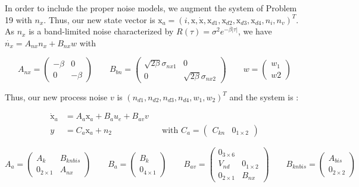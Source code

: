 In order to include the proper noise models, we augment the system of Problem 19 with $n_x$. Thus, our new state vector is $\text{x}_a = (i, \text{x}, \dot{\text{x}}, \text{x}_{d1}, \text{x}_{d2}, \text{x}_{d3}, \text{x}_{d4}, n_i, n_v)^T$. As $n_x$ is a band-limited noise characterized by $R(\tau)=\sigma^2e^{-\beta|\tau|}$, we have $\dot{n_x}=A_{nx}n_x+B_{nx}w$ with

\begin{equation*}
  A_{nx} = \begin{pmatrix}
   -\beta & 0 \\
	0 & -\beta
\end{pmatrix}
\qquad B_{bn} = \begin{pmatrix}
	\sqrt{2\beta}\sigma_{nx1} & 0 \\
	0 & \sqrt{2\beta}\sigma_{nx2} 
\end{pmatrix}
\qquad w = \begin{pmatrix}
	w_1 \\
	w2
	\end{pmatrix}
\end{equation*}

Thus, our new process noise $v$ is $(n_{d1}, n_{d2}, n_{d3}, n_{d4}, w_1, w_2)^T$ and the system is :

\begin{align*}
\dot{\text{x}}_a &= A_a \text{x}_a + B_a u_e + B_{av} v \\
y &= C_a \text{x}_a + n_2 \qquad \qquad \qquad \text{with }C_{a} = \begin{pmatrix}
	C_{kn} & 0_{1\times 2}
	\end{pmatrix}
\end{align*}

\begin{equation*}
  A_{a} = \begin{pmatrix}
   A_k & B_{kn bis} \\
	0_{2\times 1} & A_{nx}
\end{pmatrix}
\qquad B_{a} = \begin{pmatrix}
	B_k \\
	0_{4\times 1}
\end{pmatrix}
\qquad B_{av} = \begin{pmatrix}
	0_{3\times 6} \\
	V_{nd} & 0_{1\times 2} \\
	0_{2\times 1} & B_{nx}
	\end{pmatrix}
	\qquad B_{kn bis} = \begin{pmatrix}
	A_{bis}\\
	0_{2\times 2}
	\end{pmatrix}
\end{equation*}
